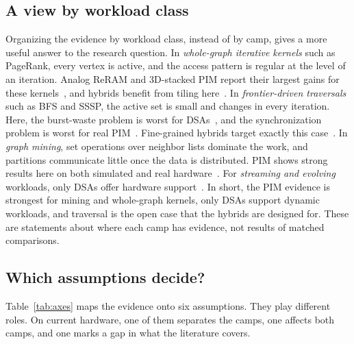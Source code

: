 \documentclass[journal,onecolumn]{IEEEtran}
\begin{document}
\subsection{A view by workload class}
Organizing the evidence by workload class, instead of by camp, gives a more useful answer to the research question. In \emph{whole-graph iterative kernels} such as PageRank, every vertex is active, and the access pattern is regular at the level of an iteration. Analog ReRAM and 3D-stacked PIM report their largest gains for these kernels~\cite{song2018graphr,challapalle2020gaasx,ahn2015tesseract}, and hybrids benefit from tiling here~\cite{shin2025piccolo}. In \emph{frontier-driven traversals} such as BFS and SSSP, the active set is small and changes in every iteration. Here, the burst-waste problem is worst for DSAs~\cite{shin2025piccolo}, and the synchronization problem is worst for real PIM~\cite{gomezluna2022prim,barkhordar2025alphapim}. Fine-grained hybrids target exactly this case~\cite{shin2025fala,yenimol2026cograf}. In \emph{graph mining}, set operations over neighbor lists dominate the work, and partitions communicate little once the data is distributed. PIM shows strong results here on both simulated and real hardware~\cite{besta2021sisa,talati2022ndminer,cai2024pimpam}. For \emph{streaming and evolving} workloads, only DSAs offer hardware support~\cite{rahman2021jetstream,zhao2022tdgraph,gao2023mega}. In short, the PIM evidence is strongest for mining and whole-graph kernels, only DSAs support dynamic workloads, and traversal is the open case that the hybrids are designed for. These are statements about where each camp has evidence, not results of matched comparisons.

\subsection{Which assumptions decide?}
Table~\ref{tab:axes} maps the evidence onto six assumptions. They play different roles. On current hardware, one of them separates the camps, one affects both camps, and one marks a gap in what the literature covers.
\end{document}
